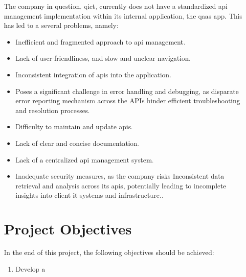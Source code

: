 \begin{multicols}{2}
    The company in question, \acrshort{qict}, currently does not have a standardized \acrshort{api} management implementation
    within its internal application, the \acrshort{qaas} app. This has led to a several problems, namely:
    \begin{itemize}
        \item Inefficient and fragmented approach to \acrshort{api} management.
        \item Lack of user-friendliness, and slow and unclear navigation.
        \item Inconsistent integration of \acrshort{api}s into the application.
        \item Poses a significant challenge in error handling and debugging, as disparate error reporting mechanism
              across the APIs hinder efficient troubleshooting and resolution processes.
        \item Difficulty to maintain and update \acrshort{api}s.
        \item Lack of clear and concise documentation.
        \item Lack of a centralized \acrshort{api} management system.
        \item Inadequate security measures, as the company risks Inconsistent data retrieval and analysis across its \acrshort{api}s,
              potentially leading to incomplete insights into client \acrshort{it} systems and infrastructure..
    \end{itemize}
\end{multicols}
\section{Project Objectives}
In the end of this project, the following objectives should be achieved:
\begin{enumerate}
    \item Develop a
\end{enumerate}
